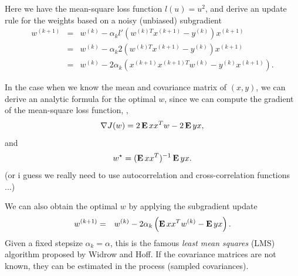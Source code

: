 \documentclass[12pt]{article}
\begin{document}
Here we have the mean-square loss function $l(u) = u^2$,
and derive an update rule for the weights based on
a noisy (unbiased) subgradient
\begin{eqnarray*}
w^{(k+1)} & = & w^{(k)}-\alpha_k
l'(w^{(k)T}x^{(k+1)}-y^{(k)})x^{(k+1)} \\
& = & w^{(k)}-\alpha_k
2(w^{(k)T}x^{(k+1)}-y^{(k)})x^{(k+1)} \\
& = & w^{(k)} - 2\alpha_k
\left( x^{(k+1)} x^{(k+1)T}w^{(k)}
- y^{(k)}x^{(k+1)} \right).
\end{eqnarray*}

In the case when we know the mean and covariance matrix of $(x,y)$,
we can derive an analytic formula for the optimal $w$,
since we can compute the gradient of the mean-square loss function,
\ie,
\[
\nabla J(w) = 2\mathop{\bf E{}} x x^T w - 2 \mathop{\bf E{}} yx,
\]
and
\[
w^\star = (\mathop{\bf E{}} x x^T)^{-1} \mathop{\bf E{}} yx.
\]
(or i guess we really need to use autocorrelation
and cross-correlation functions ...)

We can also obtain the optimal $w$ by applying
the subgradient update
\begin{eqnarray*}
w^{(k+1)} & = & w^{(k)} - 2\alpha_k
\left( \mathop{\bf E{}} x x^T w^{(k)}
- \mathop{\bf E{}} yx \right).
\end{eqnarray*}
Given a fixed stepsize $\alpha_k = \alpha$,
this is the famous \emph{least mean squares} (LMS)
algorithm proposed by Widrow and Hoff.
If the covariance matrices are not known, they can
be estimated in the process (sampled covariances).
\end{document}
